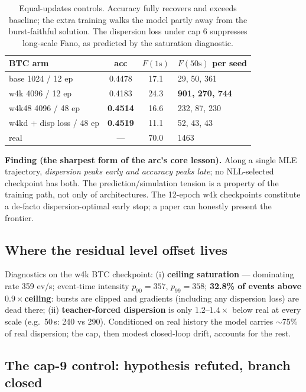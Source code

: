 \documentclass[11pt]{article}
\newcommand{\Fano}{F}
\begin{document}
\begin{table}[h]\centering\small
\begin{tabular}{lccl}
\toprule
BTC arm & acc & $\Fano(1\text{s})$ & $\Fano(50\text{s})$ per seed \\
\midrule
base 1024 / 12 ep & 0.4478 & 17.1 & 29, 50, 361 \\
w4k 4096 / 12 ep & 0.4183 & 24.3 & \textbf{901, 270, 744} \\
w4k48 4096 / 48 ep & \textbf{0.4514} & 16.6 & 232, 87, 230 \\
w4kd + disp loss / 48 ep & \textbf{0.4519} & 11.1 & 52, 43, 43 \\
real & --- & 70.0 & 1463 \\
\bottomrule
\end{tabular}
\caption{Equal-updates controls. Accuracy fully recovers and exceeds baseline; the
extra training walks the model partly away from the burst-faithful solution.
The dispersion loss under cap 6 suppresses long-scale Fano, as predicted by the
saturation diagnostic.}
\label{tab:controls}
\end{table}

\noindent\textbf{Finding (the sharpest form of the arc's core lesson).} Along a
single MLE trajectory, \emph{dispersion peaks early and accuracy peaks late}; no
NLL-selected checkpoint has both. The prediction/simulation tension is a property of
the training path, not only of architectures. The 12-epoch w4k checkpoints constitute
a de-facto dispersion-optimal early stop; a paper can honestly present the frontier.

\subsection{Where the residual level offset lives}

Diagnostics on the w4k BTC checkpoint: (i) \textbf{ceiling saturation} --- dominating
rate 359 ev/s; event-time intensity $p_{90}=357$, $p_{99}=358$; \textbf{32.8\% of
events above $0.9\times$ceiling}: bursts are clipped and gradients (including any
dispersion loss) are dead there; (ii) \textbf{teacher-forced dispersion} is only
$1.2$--$1.4\times$ below real at every scale (e.g.\ 50\,s: 240 vs 290). Conditioned on
real history the model carries $\sim$75\% of real dispersion; the cap, then modest
closed-loop drift, accounts for the rest.

\subsection{The cap-9 control: hypothesis refuted, branch closed}
\end{document}

